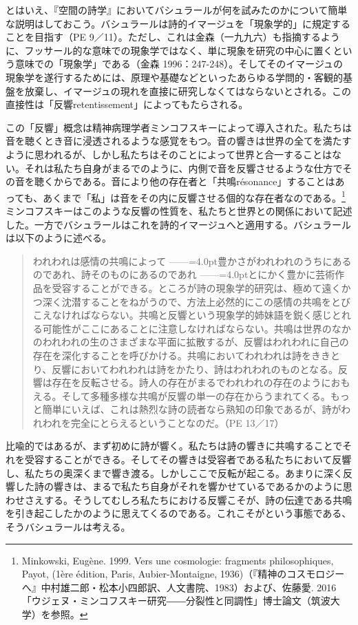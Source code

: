\documentclass[b5j,twoside,twocolumn]{utarticle}
\begin{document}
とはいえ、『空間の詩学』においてバシュラールが何を試みたのかについて簡単な説明はしておこう。バシュラールは詩的イマージュを「現象学的」に規定することを目指す（PE 9／11）。ただし、これは金森（一九九六）も指摘するように、フッサール的な意味での現象学ではなく、単に現象を研究の中心に置くという意味での「現象学」である（金森 1996：247-248）。そしてそのイマージュの現象学を遂行するためには、原理や基礎などといったあらゆる学問的・客観的基盤を放棄し、イマージュの現れを直接に研究しなくてはならないとされる。この直接性は「反響retentissement」によってもたらされる。


この「反響」概念は精神病理学者ミンコフスキーによって導入された。私たちは音を聴くとき音に浸透されるような感覚をもつ。音の響きは世界の全てを満たすように思われるが、しかし私たちはそのことによって世界と合一することはない。それは私たち自身がまるでのように、内側で音を反響させるような仕方でその音を聴くからである。音により他の存在者と「共鳴résonance」することはあっても、あくまで「私」は音をその内に反響させる個的な存在者なのである。\footnote{Minkowski, Eugène. 1999. Vers une cosmologie: fragments philosophiques, Payot, (1ère édition, Paris, Aubier-Montaigne, 1936)（『精神のコスモロジーへ』中村雄二郎・松本小四郎訳、人文書院、1983）および、佐藤愛. 2016「ウジェヌ・ミンコフスキー研究――分裂性と同調性」博士論文（筑波大学）を参照。}ミンコフスキーはこのような反響の性質を、私たちと世界との関係において記述した。一方でバシュラールはこれを詩的イマージュへと適用する。バシュラールは以下のように述べる。
\begin{quote}
われわれは感情の共鳴によって\tbaselineshift =2.5pt ------\tbaselineshift =4.0pt豊かさがわれわれのうちにあるのであれ、詩そのものにあるのであれ\tbaselineshift =2.5pt ------\tbaselineshift =4.0ptとにかく豊かに芸術作品を受容することができる。ところが詩の現象学的研究は、極めて遠くかつ深く沈潜することをねがうので、方法上必然的にこの感情の共鳴をとびこえなければならない。共鳴と反響という現象学的姉妹語を鋭く感じとれる可能性がここにあることに注意しなければならない。共鳴は世界のなかのわれわれの生のさまざまな平面に拡散するが、反響はわれわれに自己の存在を深化することを呼びかける。共鳴においてわれわれは詩をききとり、反響においてわれわれは詩をかたり、詩はわれわれのものとなる。反響は存在を反転させる。詩人の存在がまるでわれわれの存在のようにおもえる。そして多種多様な共鳴が反響の単一の存在からうまれてくる。もっと簡単にいえば、これは熱烈な詩の読者なら熟知の印象であるが、詩がわれわれを完全にとらえるということなのだ。（PE 13／17）
\end{quote}

比喩的ではあるが、まず初めに詩が響く。私たちは詩の響きに共鳴することでそれを受容することができる。そしてその響きは受容者である私たちにおいて反響し、私たちの奥深くまで響き渡る。しかしここで反転が起こる。あまりに深く反響した詩の響きは、まるで私たち自身がそれを響かせているであるかのように思わせさえする。そうしてむしろ私たちにおける反響こそが、詩の伝達である共鳴を引き起こしたかのように思えてくるのである。これこそがという事態である、そうバシュラールは考える。
\end{document}

